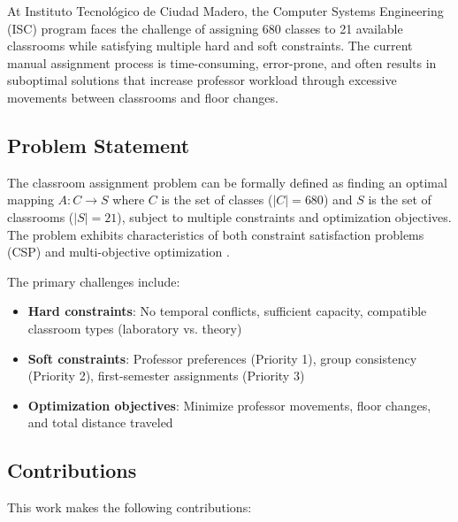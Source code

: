 \documentclass[12pt,a4paper]{article}
\begin{document}
At Instituto Tecnológico de Ciudad Madero, the Computer Systems Engineering (ISC) program faces the challenge of assigning 680 classes to 21 available classrooms while satisfying multiple hard and soft constraints. The current manual assignment process is time-consuming, error-prone, and often results in suboptimal solutions that increase professor workload through excessive movements between classrooms and floor changes.

\subsection{Problem Statement}

The classroom assignment problem can be formally defined as finding an optimal mapping $A: C \rightarrow S$ where $C$ is the set of classes ($|C|=680$) and $S$ is the set of classrooms ($|S|=21$), subject to multiple constraints and optimization objectives. The problem exhibits characteristics of both constraint satisfaction problems (CSP) and multi-objective optimization \citep{lewis2007}.

The primary challenges include:
\begin{itemize}
\item \textbf{Hard constraints}: No temporal conflicts, sufficient capacity, compatible classroom types (laboratory vs. theory)
\item \textbf{Soft constraints}: Professor preferences (Priority 1), group consistency (Priority 2), first-semester assignments (Priority 3)
\item \textbf{Optimization objectives}: Minimize professor movements, floor changes, and total distance traveled
\end{itemize}

\subsection{Contributions}

This work makes the following contributions:
\end{document}
